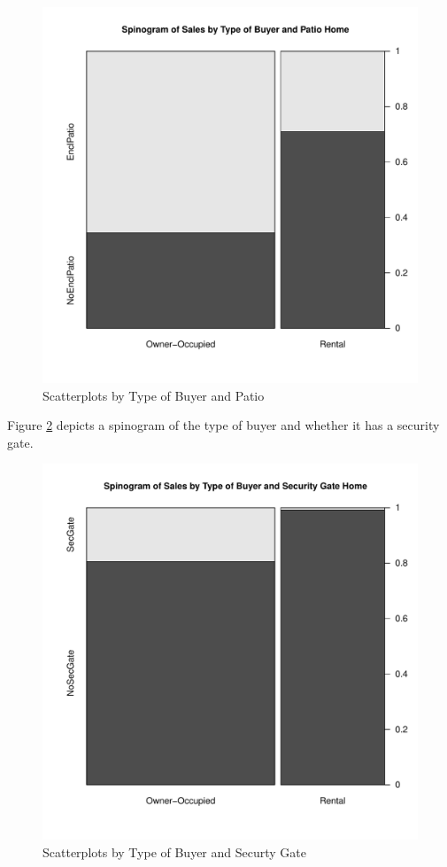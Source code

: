 \begin{figure}[h!]
  \centering
  \includegraphics[scale = 0.5, keepaspectratio=true]{../Figures/buyer_and_EnclPatio_sales}
  \caption{Scatterplots by Type of Buyer and Patio} \label{fig:buyer_and_EnclPatio_sales}
\end{figure}

\pagebreak

Figure \ref{fig:buyer_and_SecGate_sales} depicts a spinogram
of the type of buyer and whether it has a security gate.

\begin{figure}[h!]
  \centering
  \includegraphics[scale = 0.5, keepaspectratio=true]{../Figures/buyer_and_SecGate_sales}
  \caption{Scatterplots by Type of Buyer and Securty Gate} \label{fig:buyer_and_SecGate_sales}
\end{figure}

